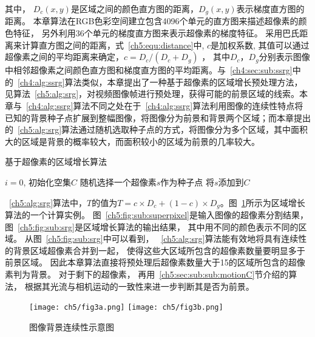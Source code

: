 其中， $D_c(x,y)$是区域之间的颜色直方图的距离，$D_g(x,y)$表示梯度直方图的距离。 本章算法在RGB色彩空间建立包含4096个单元的直方图来描述超像素的颜色特征， 另外利用36个单元的梯度直方图来表示超像素的梯度特征。 采用巴氏距离来计算直方图之间的距离，式~\ref{ch5:equ:distance}中, $c$是加权系数, 其值可以通过超像素之间的平均距离来确定，$c = D_c / (D_c + D_g)$  ， 其中$D_c$，$D_g$分别表示图像中相邻超像素之间颜色直方图和梯度直方图的平均距离。与~\ref{ch4:sec:sub:ssrg}中的~\ref{ch4:alg:ssrg}算法类似，本章提出了一种基于超像素的区域增长预处理方法，见算法~\ref{ch5:alg:srg}，对视频图像帧进行预处理，获得可能的前景区域的线索。本章与~\ref{ch4:alg:ssrg}算法不同之处在于~\ref{ch4:alg:ssrg}算法利用图像的连续性特点将已知的背景种子点扩展到整幅图像，将图像分为前景和背景两个区域；而本章提出的~\ref{ch5:alg:srg}算法通过随机选取种子点的方式，将图像分为多个区域，其中面积大的区域是背景的概率较大，而面积较小的区域为前景的几率较大。
\renewcommand{\algorithmcfname}{算法}
\begin{algorithm}[ht]
\caption{基于超像素的区域增长算法}
\label{ch5:alg:srg}
\LinesNumbered
{}
  $i=0$, 初始化空集$C$ \;
 随机选择一个超像素$s$作为种子点\;
 将$s$添加到$C$ \;
\end{algorithm}

~\ref{ch5:alg:srg}算法中，$T$的值为$T= c \times D_c + (1-c) \times D_g$。图~\ref{ch5:fig:srg}所示为区域增长算法的一个计算实例。 图~\ref{ch5:fig:sub:superpixel}是输入图像的超像素分割结果， 图~\ref{ch5:fig:sub:srg}是区域增长算法的输出结果， 其中用不同的颜色表示不同的区域。 从图~\ref{ch5:fig:sub:srg}中可以看到， ~\ref{ch5:alg:srg}算法能有效地将具有连续性的背景区域超像素合并到一起， 使得这些大区域所包含的超像素数量要明显多于前景区域。 因此本章算法直接将预处理后超像素数量大于15的区域所包含的超像素判为背景。 对于剩下的超像素， 再用~\ref{ch5:sec:sub:sub:motionC}节介绍的算法， 根据其光流与相机运动的一致性来进一步判断其是否为前景。
 \begin{figure}[htb]
  \centering%
    {\texttt{[image: ch5/fig3a.png]}}%
 \hspace{1em}%
      {\texttt{[image: ch5/fig3b.png]}}

  \caption{图像背景连续性示意图}\label{ch5:fig:srg}
\end{figure}

